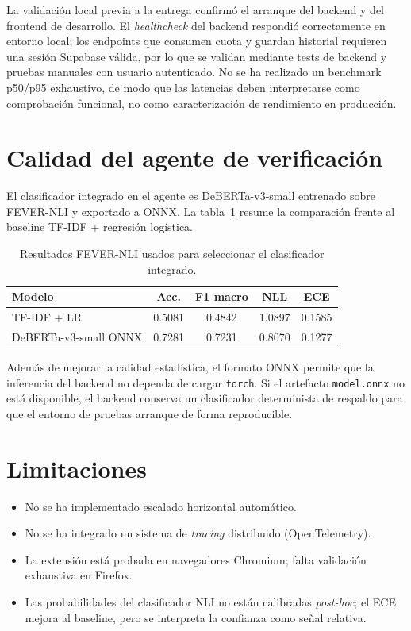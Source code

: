 La validación local previa a la entrega confirmó el arranque del
backend y del frontend de desarrollo. El \emph{healthcheck} del backend
respondió correctamente en entorno local; los endpoints que consumen
cuota y guardan historial requieren una sesión Supabase válida, por lo
que se validan mediante tests de backend y pruebas manuales con usuario
autenticado. No se ha realizado un benchmark p50/p95 exhaustivo, de
modo que las latencias deben interpretarse como comprobación funcional,
no como caracterización de rendimiento en producción.

\section{Calidad del agente de verificación}

El clasificador integrado en el agente es DeBERTa-v3-small entrenado
sobre FEVER-NLI y exportado a ONNX. La tabla~\ref{tab:fever-integrado}
resume la comparación frente al baseline TF-IDF + regresión logística.

\begin{table}[h]
      \centering
      \begin{tabular}{lcccc}
            \toprule
            Modelo & Acc. & F1 macro & NLL & ECE \\
            \midrule
            TF-IDF + LR & 0.5081 & 0.4842 & 1.0897 & 0.1585 \\
            DeBERTa-v3-small ONNX & 0.7281 & 0.7231 & 0.8070 & 0.1277 \\
            \bottomrule
      \end{tabular}
      \caption{Resultados FEVER-NLI usados para seleccionar el clasificador integrado.}
      \label{tab:fever-integrado}
\end{table}

Además de mejorar la calidad estadística, el formato ONNX permite que
la inferencia del backend no dependa de cargar \texttt{torch}. Si el
artefacto \texttt{model.onnx} no está disponible, el backend conserva
un clasificador determinista de respaldo para que el entorno de pruebas
arranque de forma reproducible.

\section{Limitaciones}

\begin{itemize}[leftmargin=*,itemsep=0.2em]
  \item No se ha implementado escalado horizontal automático.
  \item No se ha integrado un sistema de \emph{tracing} distribuido
        (OpenTelemetry).
  \item La extensión está probada en navegadores Chromium; falta
        validación exhaustiva en Firefox.
  \item Las probabilidades del clasificador NLI no están calibradas
        \emph{post-hoc}; el ECE mejora al baseline, pero se interpreta
        la confianza como señal relativa.
\end{itemize}

